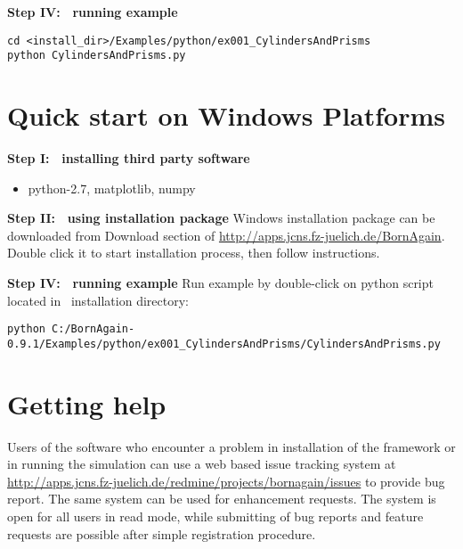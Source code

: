 \noindent
{\bf Step IV: $~$ running example}
\begin{lstlisting}[language=shell, style=commandline]
cd <install_dir>/Examples/python/ex001_CylindersAndPrisms
python CylindersAndPrisms.py
\end{lstlisting}



\section{Quick start on Windows Platforms}

\noindent
{\bf Step I: $~$ installing third party software}
\begin{itemize}
\item python-2.7, matplotlib, numpy
\end{itemize}
\vspace*{2mm}

\noindent
{\bf Step II: $~$ using installation package } \newline
Windows installation package can be downloaded from Download section of \url{http://apps.jcns.fz-juelich.de/BornAgain}.
Double click it to start installation process, then follow instructions.
\vspace*{2mm}

\noindent
{\bf Step IV: $~$ running example} \newline
Run example by double-click on python script located in \BornAgain\ installation directory:
\begin{lstlisting}[language=shell, style=commandline]
python C:/BornAgain-0.9.1/Examples/python/ex001_CylindersAndPrisms/CylindersAndPrisms.py
\end{lstlisting}


\section{Getting help}
Users of the software who encounter a problem in installation of the framework or in running the simulation can use a web based issue tracking system
at \url{http://apps.jcns.fz-juelich.de/redmine/projects/bornagain/issues} to provide bug
report. The same system can be used for enhancement requests.
The system is open for all users in read mode, while 
submitting of bug reports and feature requests are possible after simple registration
procedure.







